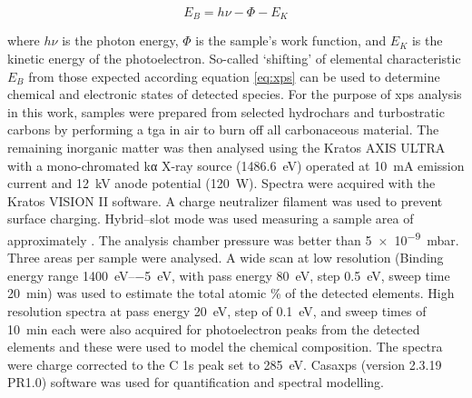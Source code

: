 \begin{equation}\label{eq:xps}
    E_B = h\nu - \Phi - E_K
\end{equation}

where $h\nu$ is the photon energy, $\Phi$ is the sample’s work function, and $E_K$ is the kinetic energy of the photoelectron. So-called `shifting' of elemental characteristic $E_B$ from those expected according equation \ref{eq:xps} can be used to determine chemical and electronic states of detected species.\citep{moulder1995handbook} For the purpose of \acrshort{xps} analysis in this work, samples were prepared from selected \glspl{hydrochar} and \glspl{turbostratic carbon} by performing a \acrshort{tga} in air to burn off all carbonaceous material. The remaining inorganic matter was then analysed using the Kratos AXIS ULTRA with a mono-chromated k\textgreek{α} X-ray source (\qty{1486.6}{\electronvolt}) operated at \qty{10}{\mA} emission current and \qty{12}{\kilo\volt} anode potential (\qty{120}{\watt}). Spectra were acquired with the Kratos VISION II software. A charge neutralizer filament was used to prevent surface charging. Hybrid–slot mode was used measuring a sample area of approximately . The analysis chamber pressure was better than \qty{5e-9}{\milli\bar}. Three areas per sample were analysed. A wide scan at low resolution (Binding energy range \qtyrange{1400}{-5}{\electronvolt}, with pass energy \qty{80}{\electronvolt}, step \qty{0.5}{\electronvolt}, sweep time \qty{20}{\minute}) was used to estimate the total atomic \% of the detected elements. High resolution spectra at pass energy \qty{20}{\electronvolt}, step of \qty{0.1}{\electronvolt}, and sweep times of \qty{10}{\minute} each were also acquired for photoelectron peaks from the detected elements and these were used to model the chemical composition. The spectra were charge corrected to the C 1s peak set to \qty{285}{\electronvolt}. Casaxps (version 2.3.19 PR1.0) software\citep{fairley2021systematic} was used for quantification and spectral modelling.

